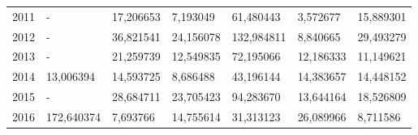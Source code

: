 \begin{table}
\begin{tabular}{p{1cm}p{2cm}p{2cm}p{2cm}p{2cm}p{2cm}p{2cm}}
 2011 &                - &                        17,206653 &     7,193049 &              61,480443 &                    3,572677 &                    15,889301 \\
 2012 &                - &                        36,821541 &    24,156078 &             132,984811 &                    8,840665 &                    29,493279 \\
 2013 &                - &                        21,259739 &    12,549835 &              72,195066 &                   12,186333 &                    11,149621 \\
 2014 &        13,006394 &                        14,593725 &     8,686488 &              43,196144 &                   14,383657 &                    14,448152 \\
 2015 &                - &                        28,684711 &    23,705423 &              94,283670 &                   13,644164 &                    18,526809 \\
 2016 &       172,640374 &                         7,693766 &    14,755614 &              31,313123 &                   26,089966 &                     8,711586 \\
\bottomrule
\end{tabular}
\end{table}
